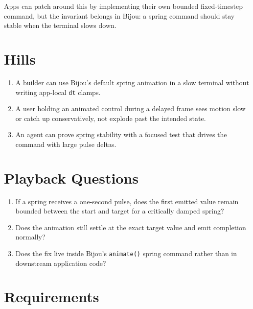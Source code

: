 Apps can patch around this by implementing their own bounded fixed-timestep command, but the invariant belongs in Bijou: a spring command should stay stable when the terminal slows down.

\section{Hills}\label{record-161-hills}

\begin{enumerate}
\def\labelenumi{\arabic{enumi}.}
\tightlist
\item
  A builder can use Bijou's default spring animation in a slow terminal without writing app-local \texttt{d\allowbreak{}t} clamps.
\item
  A user holding an animated control during a delayed frame sees motion slow or catch up conservatively, not explode past the intended state.
\item
  An agent can prove spring stability with a focused test that drives the command with large pulse deltas.
\end{enumerate}

\section{Playback Questions}\label{record-161-playback-questions}

\begin{enumerate}
\def\labelenumi{\arabic{enumi}.}
\tightlist
\item
  If a spring receives a one-second pulse, does the first emitted value remain bounded between the start and target for a critically damped spring?
\item
  Does the animation still settle at the exact target value and emit completion normally?
\item
  Does the fix live inside Bijou's \texttt{a\allowbreak{}n\allowbreak{}i\allowbreak{}m\allowbreak{}a\allowbreak{}t\allowbreak{}e\allowbreak{}(\allowbreak{})} spring command rather than in downstream application code?
\end{enumerate}

\section{Requirements}\label{record-161-requirements}

